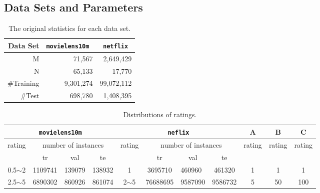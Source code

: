 \documentclass[11pt,twoside]{article}
\begin{document}
\subsection{Data Sets and Parameters}
\begin{table}[H]
\centering
\begin{tabular}{r|rr}
Data Set   & \tt movielens10m & \tt netflix  \\ \hline
M          & 71,567        & 2,649,429  \\
N          & 65,133        & 17,770    \\
\#Training & 9,301,274      & 99,072,112 \\
\#Test     & 698,780       & 1,408,395 
\end{tabular}
\caption{The original statistics for each data set.}
\label{tab:original_data}
\end{table}
\begin{table}[H]
\centering
\begin{tabular}{|c|c|l|c|c|c|l|c|c|c|c|}
\hline
\multicolumn{4}{|c|}{\tt movielens10m}                                    & \multicolumn{4}{c|}{\tt neflix}                                             & A                       & B                       & C                                            \\ \hline
\multirow{2}{*}{rating} & \multicolumn{3}{c|}{number of instances}    & \multirow{2}{*}{rating} & \multicolumn{3}{c|}{number of instances}      & \multirow{2}{*}{rating} & \multirow{2}{*}{rating} & \multicolumn{1}{l|}{\multirow{2}{*}{rating}} \\ \cline{2-4} \cline{6-8}
                        & tr      & \multicolumn{1}{c|}{val} & te     &                         & tr       & \multicolumn{1}{c|}{val} & te      &                         &                         & \multicolumn{1}{l|}{}                        \\ \hline
0.5$\sim$2              & 1109741 & 139079                   & 138932 & 1                       & 3695710  & 460960                   & 461320  & 1                       & 1                       & 1                                            \\ \hline
2.5$\sim$5              & 6890302 & 860926                   & 861074 & 2$\sim$5                & 76688695 & 9587090                  & 9586732 & 5                       & 50                      & 100                                          \\ \hline
\end{tabular}
\caption{Distributions of ratings.}
\label{tab:data_dist}
\end{table}
\end{document}
